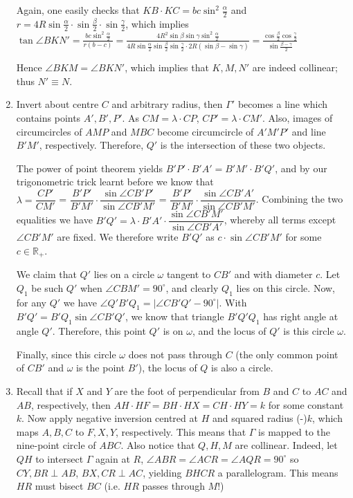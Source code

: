 \documentclass[11pt,a4paper]{article}
\begin{document}
\begin{enumerate}
Again, one easily checks that $KB\cdot KC=bc\sin^2\frac{\alpha}2$ and $r=4R\sin\frac{\alpha}2\cdot \sin\frac{\beta}2\cdot
\sin\frac{\gamma}2$, which implies $\tan\angle
BKN\prime =\frac{bc\sin^2\frac{\alpha}2}{r(b-c)}=\frac{4R^2\sin
\beta\sin\gamma\sin^2\frac{\alpha}2}{4R\sin\frac{\alpha}2\sin
\frac{\beta}2\sin\frac{\gamma}2\cdot2R(\sin\beta-\sin\gamma)}=
\frac{\cos\frac{\beta}2\cos\frac{\gamma}2}{\sin\frac{\beta-\gamma}
2}$
                                                
Hence $\angle BKM=\angle BKN\prime$, which implies that $K,M,N'$ are indeed collinear; thus $N'\equiv N$. 

\item Invert about centre $C$ and arbitrary radius, then $\Gamma'$ becomes a line which contains points $A', B', P'$. As $CM=\lambda\cdot CP$, $CP'=\lambda\cdot CM'$. Also, images of circumcircles of $AMP$ and $MBC$ become circumcircle of $A'M'P'$ and line $B'M'$, respectively. Therefore, $Q'$ is the intersection of these two objects.

The power of point theorem yields $B'P'\cdot B'A'=B'M'\cdot B'Q'$, and by our trigonometric trick learnt before we know that\\
$\lambda=\dfrac{CP'}{CM'}$ = $\dfrac{B'P'}{B'M'}\cdot\dfrac{\sin\angle CB'P'}{\sin\angle CB'M'}$ = $\dfrac{B'P'}{B'M'}\cdot\dfrac{\sin\angle CB'A'}{\sin\angle CB'M'}$. Combining the two equalities we have $B'Q'=\lambda\cdot B'A'\cdot\dfrac{\sin\angle CB'M'}{\sin\angle CB'A'}$, whereby all terms except $\angle CB'M'$ are fixed. We therefore write $B'Q'$ as $c\cdot\sin\angle CB'M'$ for some $c\in\mathbb{R}_+$.

We claim that $Q'$ lies on a circle $\omega$ tangent to $CB'$ and with diameter $c$. Let $Q_1$ be such $Q'$ when $\angle CBM'=90^{\circ}$, and clearly $Q_1$ lies on this circle. Now, for any $Q'$ we have $\angle Q'B'Q_1=|\angle CB'Q'-90^{\circ}|$. With $B'Q'=B'Q_1\sin\angle CB'Q'$, we know that triangle $B'Q'Q_1$ has right angle at angle $Q'$. Therefore, this point $Q'$ is on $\omega$, and the locus of $Q'$ is this circle $\omega$.

Finally, since this circle $\omega$ does not pass through $C$ (the only common point of $CB'$ and $\omega$ is the point $B'$), the locus of $Q$ is also a circle.

\item Recall that if $X$ and $Y$ are the foot of perpendicular from $B$ and $C$ to $AC$ and $AB$, respectively, then $AH\cdot HF=BH\cdot HX=CH\cdot HY=k$ for some constant $k$. Now apply negative inversion centred at $H$ and squared radius (-)$k$, which maps $A,B,C$ to $F,X,Y$, respectively. This means that $\Gamma$ is mapped to the nine-point circle of $ABC$. Also notice that $Q,H,M$ are collinear. Indeed, let $QH$ to intersect $\Gamma$ again at $R$, $\angle ABR=\angle ACR=\angle AQR=90^{\circ}$ so $CY, BR\perp AB$, $BX, CR\perp AC$, yielding $BHCR$ a parallelogram. This means $HR$ must bisect $BC$ (i.e. $HR$ passes through $M$!)


\end{enumerate}
\end{document}
